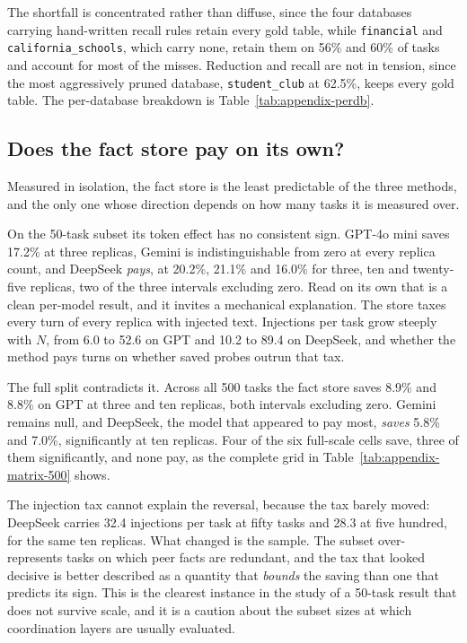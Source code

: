 \documentclass[conference]{IEEEtran}
\begin{document}
The shortfall is concentrated rather than diffuse, since the four databases
carrying
hand-written recall rules retain every gold table, while \texttt{financial} and
\texttt{california\_schools}, which carry none, retain them on 56\% and 60\% of
tasks and account for most of the misses. Reduction and recall are not in
tension, since the most aggressively pruned database, \texttt{student\_club} at
62.5\%, keeps every gold table. The per-database breakdown is
Table~\ref{tab:appendix-perdb}.

\subsection{Does the fact store pay on its own?}\label{sec:results-p3}

Measured in isolation, the fact store is the least predictable of the three
methods, and the only one whose direction depends on how many tasks it is
measured over.

On the 50-task subset its token effect has no consistent sign. GPT-4o mini saves
17.2\% at three replicas, Gemini is indistinguishable from zero at every replica
count, and DeepSeek \emph{pays}, at 20.2\%, 21.1\% and 16.0\% for three, ten and
twenty-five replicas, two of the three intervals excluding zero. Read on its own
that is a clean per-model result, and it invites a mechanical explanation. The
store taxes every turn of every replica with injected text. Injections per task
grow steeply with $N$, from 6.0 to 52.6 on GPT and 10.2 to 89.4 on DeepSeek, and
whether the method pays turns on whether saved probes outrun that tax.

The full split contradicts it. Across all 500 tasks the fact store saves 8.9\%
and 8.8\% on GPT at three and ten replicas, both intervals excluding zero.
Gemini remains null, and DeepSeek, the model that appeared to pay most,
\emph{saves} 5.8\% and 7.0\%, significantly at ten replicas. Four of the six
full-scale cells save, three of them significantly, and none pay, as the
complete grid in Table~\ref{tab:appendix-matrix-500} shows.

The injection tax cannot explain the reversal, because the tax barely moved:
DeepSeek carries 32.4 injections per task at fifty tasks and 28.3 at five
hundred, for the same ten replicas. What changed is the sample. The subset
over-represents tasks on which peer facts are redundant, and the tax that looked
decisive is better described as a quantity that \emph{bounds} the saving than
one that predicts its sign. This is the clearest instance in the study of a
50-task result that does not survive scale, and it is a caution about the subset
sizes at which coordination layers are usually evaluated.
\end{document}
